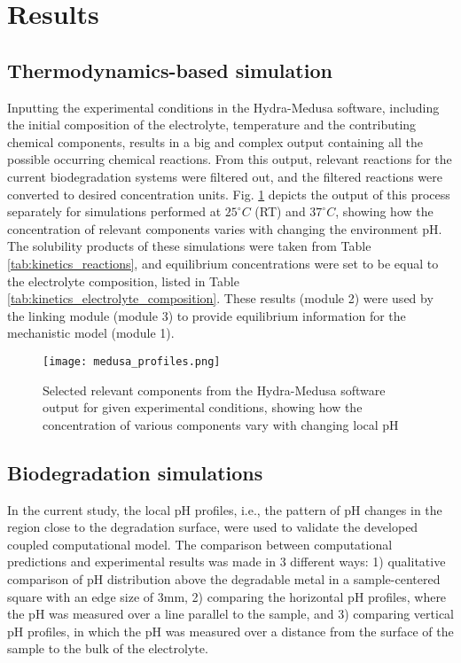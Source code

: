 \section{Results}

\subsection{Thermodynamics-based simulation}

Inputting the experimental conditions in the Hydra-Medusa software, including the initial composition of the electrolyte, temperature and the contributing chemical components, results in a big and complex output containing all the possible occurring chemical reactions. From this output, relevant reactions for the current biodegradation systems were filtered out, and the filtered reactions were converted to desired concentration units. Fig. \ref{fig:kinetics_medusa_profiles} depicts the output of this process separately for simulations performed at $25^{\circ}C$ ({RT}) and $37^{\circ}C$, showing how the concentration of relevant components varies with changing the environment pH. The solubility products of these simulations were taken from Table \ref{tab:kinetics_reactions}, and equilibrium concentrations were set to be equal to the electrolyte composition, listed in Table  \ref{tab:kinetics_electrolyte_composition}. These results (module 2) were used by the linking module (module 3) to provide equilibrium information for the mechanistic model (module 1).

\begin{figure}[ht]
\centering
\medskip
\texttt{[image: medusa\_profiles.png]}
\caption[Hydra-Medusa software output for given experimental conditions]{Selected relevant components from the Hydra-Medusa software output for given experimental conditions, showing how the concentration of various components vary with changing local pH} \label{fig:kinetics_medusa_profiles}
\end{figure}

\subsection{Biodegradation simulations}

In the current study, the local pH profiles, i.e., the pattern of pH changes in the region close to the degradation surface, were used to validate the developed coupled computational model. The comparison between computational predictions and experimental results was made in 3 different ways: 1) qualitative comparison of pH distribution above the degradable metal in a sample-centered square with an edge size of $3 \text{mm}$, 2) comparing the horizontal pH profiles, where the pH was measured over a line parallel to the sample, and 3) comparing vertical pH profiles, in which the pH was measured over a distance from the surface of the sample to the bulk of the electrolyte.

